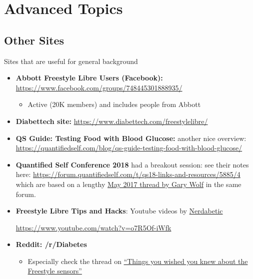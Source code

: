 \documentclass[
]{book}
\providecommand{\tightlist}{%
  \setlength{\itemsep}{0pt}\setlength{\parskip}{0pt}}
\begin{document}
\hypertarget{advanced-topics}{%
\chapter{Advanced Topics}\label{advanced-topics}}

\hypertarget{other-sites}{%
\section{Other Sites}\label{other-sites}}

Sites that are useful for general background

\begin{itemize}
\item
  \textbf{Abbott Freestyle Libre Users (Facebook):} \url{https://www.facebook.com/groups/748445301888935/}

  \begin{itemize}
  \tightlist
  \item
    Active (20K members) and includes people from Abbott
  \end{itemize}
\item
  \textbf{Diabettech site:} \url{https://www.diabettech.com/freestylelibre/}
\item
  \textbf{QS Guide: Testing Food with Blood Glucose: }another nice overview: \url{https://quantifiedself.com/blog/qs-guide-testing-food-with-blood-glucose/}
\item
  \textbf{Quantified Self Conference 2018} had a breakout session: see their notes here: \url{https://forum.quantifiedself.com/t/qs18-links-and-resources/5885/4} which are based on a lengthy \href{https://forum.quantifiedself.com/t/frequent-blood-sugar-measurement/3818}{May 2017 thread by Gary Wolf} in the same forum.
\item
  \textbf{Freestyle Libre Tips and Hacks}: Youtube videos by \href{https://www.youtube.com/channel/UC_20PWJ0X0HAloRioVvb5-A}{Nerdabetic}

  \url{https://www.youtube.com/watch?v=o7R5Of-iWfk}
\item
  \textbf{Reddit: /r/Diabetes}

  \begin{itemize}
  \tightlist
  \item
    Especially check the thread on \href{https://www.reddit.com/r/diabetes/comments/8axzlc/things_you_wished_you_knew_about_freestyle_libre/}{``Things you wished you knew about the Freestyle sensors''}
  \end{itemize}
\end{itemize}
\end{document}
